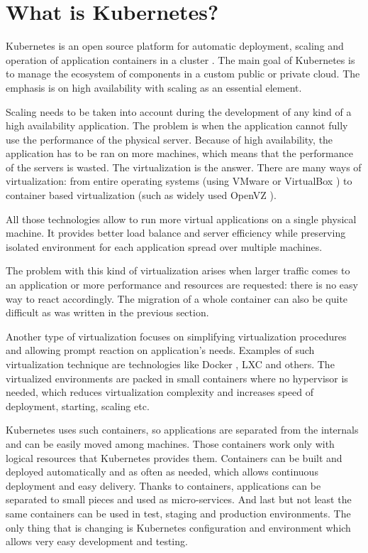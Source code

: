 \chapter{What is Kubernetes?}

Kubernetes is an open source platform for automatic deployment, scaling and operation of application containers in a cluster \cite{kubernetesio}. The main goal of Kubernetes is to manage the ecosystem of components in a custom public or private cloud. The emphasis is on high availability with scaling as an essential element.

Scaling needs to be taken into account during the development of any kind of a high availability application. The problem is when the application cannot fully use the performance of the physical server. Because of high availability, the application has to be ran on more machines, which means that the performance of the servers is wasted. The virtualization is the answer. There are many ways of virtualization: from entire operating systems (using VMware \cite{vmware} or VirtualBox \cite{virtualbox}) to container based virtualization (such as widely used OpenVZ \cite{openvz}).

All those technologies allow to run more virtual applications on a single physical machine. It provides better load balance and server efficiency while preserving isolated environment for each application spread over multiple machines.  

The problem with this kind of virtualization arises when larger traffic comes to an application or more performance and resources are requested: there is no easy way to react accordingly. The migration of a whole container can also be quite difficult as was written in the previous section.

Another type of virtualization focuses on simplifying virtualization procedures and allowing prompt reaction on application’s needs. Examples of such virtualization technique are technologies like Docker \cite{docker}, LXC \cite{lxc}  and others. The virtualized environments are packed in small containers where no hypervisor is needed, which reduces virtualization complexity and increases speed of deployment, starting, scaling etc.   

Kubernetes uses such containers, so applications are separated from the internals and can be easily moved among machines. Those containers work only with logical resources that Kubernetes provides them. Containers can be built and deployed automatically and as often as needed, which allows continuous deployment and easy delivery. Thanks to containers, applications can be separated to small pieces and used as micro-services. And last but not least the same containers can be used in test, staging and production environments. The only thing that is changing is Kubernetes configuration and environment which allows very easy development and testing.

